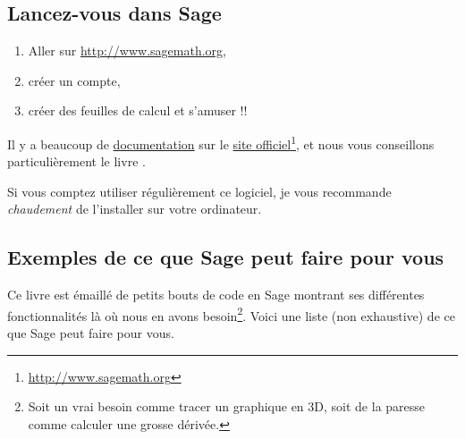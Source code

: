 \subsection{Lancez-vous dans Sage}
\label{SUBooINTROsageLancezVous}


\begin{enumerate}
	\item
	      Aller sur \url{http://www.sagemath.org},
	\item
	      créer un compte,
	\item
	      créer des feuilles de calcul et s'amuser !!
\end{enumerate}

Il y a beaucoup de \href{http://lmgtfy.com/?q=sage+documentation}{documentation} sur le \href{http://www.sagemath.org}{site officiel}\footnote{\href{http://www.sagemath.org}{http://www.sagemath.org}}, et nous vous conseillons particulièrement le livre \cite{ooBLMMooWTPsQy}.

Si vous comptez utiliser régulièrement ce logiciel, je vous recommande \emph{chaudement} de l'installer sur votre ordinateur.

\subsection{Exemples de ce que Sage peut faire pour vous}
\label{SUBooINTROsageExemples}

Ce livre est émaillé de petits bouts de code en Sage montrant ses différentes fonctionnalités là où nous en avons besoin\footnote{Soit un vrai besoin comme tracer un graphique en 3D, soit de la paresse comme calculer une grosse dérivée.}. Voici une liste (non exhaustive) de ce que Sage peut faire pour vous.

